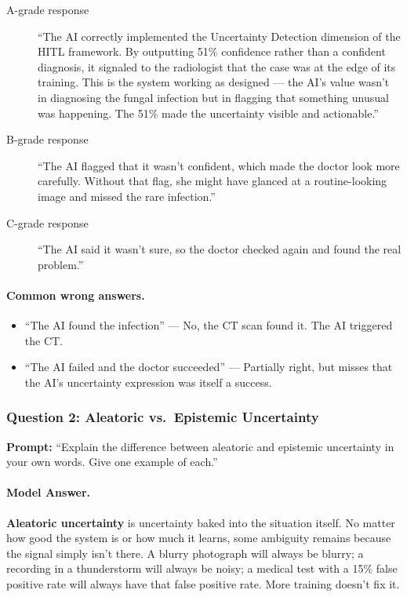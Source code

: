 \begin{description}
    \item[A-grade response] ``The AI correctly implemented the Uncertainty Detection dimension of the HITL framework. By outputting 51\% confidence rather than a confident diagnosis, it signaled to the radiologist that the case was at the edge of its training. This is the system working as designed --- the AI's value wasn't in diagnosing the fungal infection but in flagging that something unusual was happening. The 51\% made the uncertainty visible and actionable.''

    \item[B-grade response] ``The AI flagged that it wasn't confident, which made the doctor look more carefully. Without that flag, she might have glanced at a routine-looking image and missed the rare infection.''

    \item[C-grade response] ``The AI said it wasn't sure, so the doctor checked again and found the real problem.''
\end{description}

\paragraph{Common wrong answers.}
\begin{itemize}
    \item ``The AI found the infection'' --- No, the CT scan found it. The AI triggered the CT.
    \item ``The AI failed and the doctor succeeded'' --- Partially right, but misses that the AI's uncertainty expression was itself a success.
\end{itemize}

\subsubsection{Question 2: Aleatoric vs.\ Epistemic Uncertainty}

\textbf{Prompt:} ``Explain the difference between aleatoric and epistemic uncertainty in your own words. Give one example of each.''

\paragraph{Model Answer.}

\textbf{Aleatoric uncertainty} is uncertainty baked into the situation itself. No matter how good the system is or how much it learns, some ambiguity remains because the signal simply isn't there. A blurry photograph will always be blurry; a recording in a thunderstorm will always be noisy; a medical test with a 15\% false positive rate will always have that false positive rate. More training doesn't fix it.

